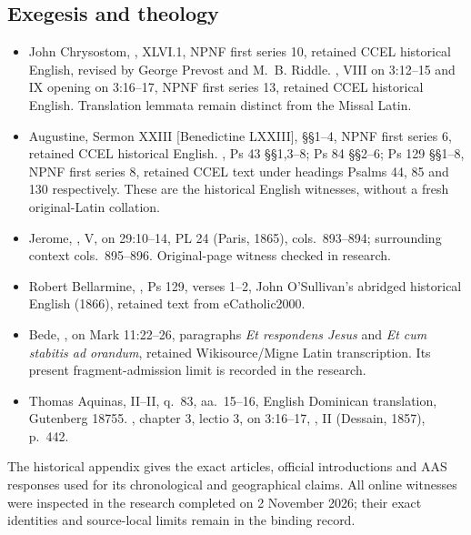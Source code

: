 \subsection{Exegesis and theology}
\begin{itemize}
\item John Chrysostom, , XLVI.1,
NPNF first series 10, retained CCEL historical English, revised by
George Prevost and M.~B. Riddle. ,
VIII on 3:12--15 and IX opening on 3:16--17, NPNF first series 13,
retained CCEL historical English. Translation lemmata remain distinct
from the Missal Latin.
\item Augustine, Sermon XXIII [Benedictine LXXIII], §§1--4,
NPNF first series 6, retained CCEL historical English.
, Ps 43 §§1,3--8;
Ps 84 §§2--6; Ps 129 §§1--8, NPNF first series 8,
retained CCEL text under headings Psalms 44, 85 and 130 respectively.
These are the historical English witnesses, without a fresh original-Latin
collation.
\item Jerome, , V, on 29:10--14,
PL 24 (Paris, 1865), cols.~893--894; surrounding context
cols.~895--896. Original-page witness checked in research.
\item Robert Bellarmine, ,
Ps 129, verses 1--2, John O'Sullivan's abridged historical English
(1866), retained text from eCatholic2000.
\item Bede, , on Mark 11:22--26,
paragraphs \textit{Et respondens Jesus} and \textit{Et cum stabitis ad
orandum}, retained Wikisource/Migne Latin transcription. Its present
fragment-admission limit is recorded in the research.
\item Thomas Aquinas,  II--II, q.~83,
aa.~15--16, English Dominican translation, Gutenberg 18755.
, chapter 3, lectio 3,
on 3:16--17, ,
II (Dessain, 1857), p.~442.
\end{itemize}
The historical appendix gives the exact articles, official introductions
and AAS responses used for its chronological and geographical claims.
All online witnesses were inspected in the research completed on
2 November 2026; their exact identities and source-local limits remain
in the binding record.
